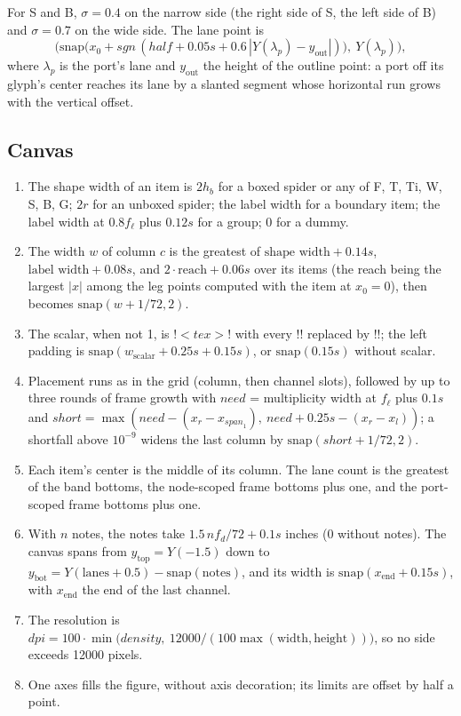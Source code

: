 {For S and B, $\sigma = 0.4$ on the narrow side (the right side of S, the left side of B) and
$\sigma = 0.7$ on the wide side. The lane point is
\[
  \bigl(\mathrm{snap}\bigl(x_0 + \mathit{sgn}\,(\mathit{half} + 0.05s + 0.6\,|Y(\lambda_p) -
  y_\text{out}|)\bigr),\ Y(\lambda_p)\bigr),
\]
where $\lambda_p$ is the port's lane and $y_\text{out}$ the height of the outline point: a port
off its glyph's center reaches its lane by a slanted segment whose horizontal run grows with the
vertical offset.

\subsection{Canvas}\label{sec:pictorial-canvas}

\begin{algorithm}\label{alg:pictorial-figure-geometry}
\begin{enumerate}
  \item The shape width of an item is $2h_b$ for a boxed spider or any of F, T, Ti, W, S, B, G;
    $2r$ for an unboxed spider; the label width for a boundary item; the label width at
    $0.8f_\ell$ plus $0.12s$ for a group; 0 for a dummy.
  \item The width $w$ of column $c$ is the greatest of $\text{shape width}+0.14s$,
    $\text{label width}+0.08s$, and $2\cdot\text{reach}+0.06s$ over its items (the reach being
    the largest $|x|$ among the leg points computed with the item at $x_0=0$), then becomes
    $\mathrm{snap}(w + 1/72, 2)$.
  \item The scalar, when not 1, is \code!$<tex>$! with every \code!\frac! replaced by
    \code!\dfrac!; the left padding is $\mathrm{snap}(w_\text{scalar} + 0.25s + 0.15s)$, or
    $\mathrm{snap}(0.15s)$ without scalar.
  \item Placement runs as in the grid (column, then channel slots), followed by up to three
    rounds of frame growth with $\mathit{need}$ = multiplicity width at $f_\ell$ plus $0.1s$ and
    $\mathit{short} = \max(\mathit{need} - (x_r - x_{\mathit{span}_1}),\ \mathit{need}+0.25s -
    (x_r-x_l))$; a shortfall above $10^{-9}$ widens the last column by
    $\mathrm{snap}(\mathit{short}+1/72, 2)$.
  \item Each item's center is the middle of its column. The lane count is the greatest of the
    band bottoms, the node-scoped frame bottoms plus one, and the port-scoped frame bottoms plus
    one.
  \item With $n$ notes, the notes take $1.5\,n f_d/72 + 0.1s$ inches (0 without notes). The
    canvas spans from $y_\text{top} = Y(-1.5)$ down to
    $y_\text{bot} = Y(\text{lanes}+0.5) - \mathrm{snap}(\text{notes})$, and its width is
    $\mathrm{snap}(x_\text{end} + 0.15s)$, with $x_\text{end}$ the end of the last channel.
  \item The resolution is $\mathit{dpi} = 100\cdot\min\bigl(\mathit{density},\
    12000/(100\max(\text{width}, \text{height}))\bigr)$, so no side exceeds 12000 pixels.
  \item One axes fills the figure, without axis decoration; its limits are offset by half a
    point.
\end{enumerate}
\end{algorithm}

}
